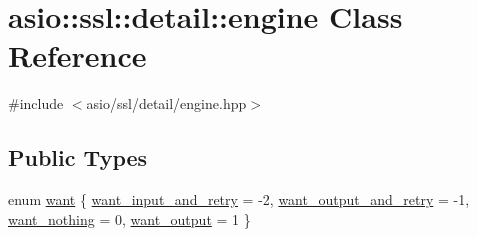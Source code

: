 \hypertarget{classasio_1_1ssl_1_1detail_1_1engine}{}\section{asio\+:\+:ssl\+:\+:detail\+:\+:engine Class Reference}
\label{classasio_1_1ssl_1_1detail_1_1engine}


{\ttfamily \#include $<$asio/ssl/detail/engine.\+hpp$>$}

\subsection*{Public Types}
\begin{DoxyCompactItemize}
\item 
enum \hyperlink{classasio_1_1ssl_1_1detail_1_1engine_ab9812153941a6a93c9095f4e5ca8f915}{want} \{ \hyperlink{classasio_1_1ssl_1_1detail_1_1engine_ab9812153941a6a93c9095f4e5ca8f915a4ed0c40b89cc4244f27cf4fa0462dc98}{want\+\_\+input\+\_\+and\+\_\+retry} = -\/2, 
\hyperlink{classasio_1_1ssl_1_1detail_1_1engine_ab9812153941a6a93c9095f4e5ca8f915ae945ff629b4b3fb8f8e4424eea2941b1}{want\+\_\+output\+\_\+and\+\_\+retry} = -\/1, 
\hyperlink{classasio_1_1ssl_1_1detail_1_1engine_ab9812153941a6a93c9095f4e5ca8f915a1b2c9a51b5a4f1cb75ef746e8c11faa8}{want\+\_\+nothing} = 0, 
\hyperlink{classasio_1_1ssl_1_1detail_1_1engine_ab9812153941a6a93c9095f4e5ca8f915ac4b31f22eb4446bfc12d48198ff1438d}{want\+\_\+output} = 1
 \}
\end{DoxyCompactItemize}
